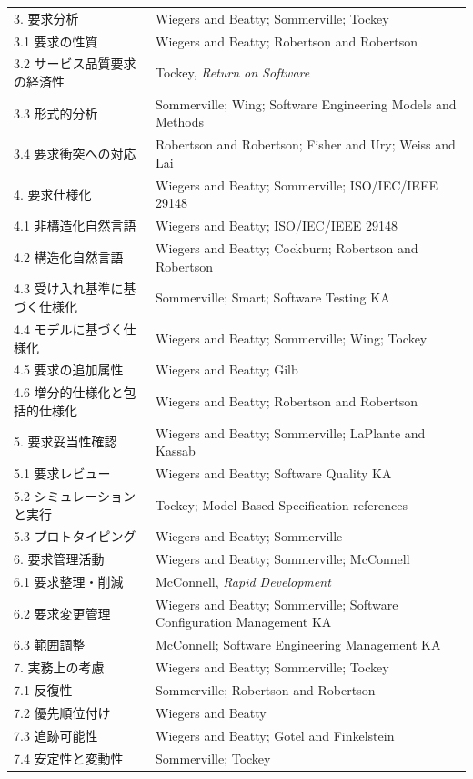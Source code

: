 \begin{longtable}{@{}p{.38\linewidth}p{.55\linewidth}@{}}
3. 要求分析 & Wiegers and Beatty; Sommerville; Tockey \\
3.1 要求の性質 & Wiegers and Beatty; Robertson and Robertson \\
3.2 サービス品質要求の経済性 & Tockey, \textit{Return on Software} \\
3.3 形式的分析 & Sommerville; Wing; Software Engineering Models and Methods \\
3.4 要求衝突への対応 & Robertson and Robertson; Fisher and Ury; Weiss and Lai \\
4. 要求仕様化 & Wiegers and Beatty; Sommerville; ISO/IEC/IEEE 29148 \\
4.1 非構造化自然言語 & Wiegers and Beatty; ISO/IEC/IEEE 29148 \\
4.2 構造化自然言語 & Wiegers and Beatty; Cockburn; Robertson and Robertson \\
4.3 受け入れ基準に基づく仕様化 & Sommerville; Smart; Software Testing KA \\
4.4 モデルに基づく仕様化 & Wiegers and Beatty; Sommerville; Wing; Tockey \\
4.5 要求の追加属性 & Wiegers and Beatty; Gilb \\
4.6 増分的仕様化と包括的仕様化 & Wiegers and Beatty; Robertson and Robertson \\
5. 要求妥当性確認 & Wiegers and Beatty; Sommerville; LaPlante and Kassab \\
5.1 要求レビュー & Wiegers and Beatty; Software Quality KA \\
5.2 シミュレーションと実行 & Tockey; Model-Based Specification references \\
5.3 プロトタイピング & Wiegers and Beatty; Sommerville \\
6. 要求管理活動 & Wiegers and Beatty; Sommerville; McConnell \\
6.1 要求整理・削減 & McConnell, \textit{Rapid Development} \\
6.2 要求変更管理 & Wiegers and Beatty; Sommerville; Software Configuration Management KA \\
6.3 範囲調整 & McConnell; Software Engineering Management KA \\
7. 実務上の考慮 & Wiegers and Beatty; Sommerville; Tockey \\
7.1 反復性 & Sommerville; Robertson and Robertson \\
7.2 優先順位付け & Wiegers and Beatty \\
7.3 追跡可能性 & Wiegers and Beatty; Gotel and Finkelstein \\
7.4 安定性と変動性 & Sommerville; Tockey \\

\end{longtable}
